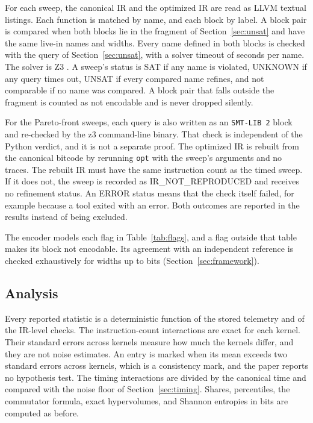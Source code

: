 For each sweep, the canonical IR and the optimized IR are read as LLVM textual listings. Each function is matched by name,
and each block by label. A block pair is compared when both blocks lie in the fragment of Section~\ref{sec:unsat} and have the
same live-in names and widths. Every name defined in both blocks is checked with the query of Section~\ref{sec:unsat}, with a
solver timeout of \ZThreeTimeoutSeconds{} seconds per name. The solver is Z3 \cite{demoura2008z3}. A sweep's status is SAT if any
name is violated, UNKNOWN if any query times out, UNSAT if every compared name refines, and not comparable if no name was
compared. A block pair that falls outside the fragment is counted as not encodable and is never dropped silently.

For the Pareto-front sweeps, each query is also written as an \texttt{SMT-LIB 2} block and re-checked by the z3 command-line
binary. That check is independent of the Python verdict, and it is not a separate proof. The optimized IR is rebuilt from the
canonical bitcode by rerunning \texttt{opt} with the sweep's arguments and no traces. The rebuilt IR must have the same
instruction count as the timed sweep. If it does not, the sweep is recorded as IR\_NOT\_REPRODUCED and receives no refinement
status. An ERROR status means that the check itself failed, for example because a tool exited with an error. Both outcomes are
reported in the results instead of being excluded.

The encoder models each flag in Table~\ref{tab:flags}, and a flag outside that table makes its block not encodable. Its agreement
with an independent reference is checked exhaustively for widths up to \EncodingMaxWidth{} bits (Section~\ref{sec:framework}).

\subsection{Analysis}

Every reported statistic is a deterministic function of the stored telemetry and of the IR-level checks. The instruction-count
interactions are exact for each kernel. Their standard errors across kernels measure how much the kernels differ, and they are
not noise estimates. An entry is marked when its mean exceeds two standard errors across kernels, which is a consistency mark,
and the paper reports no hypothesis test. The timing interactions are divided by the canonical time and compared with the noise
floor of Section~\ref{sec:timing}. Shares, percentiles, the commutator formula, exact hypervolumes, and Shannon entropies in bits
are computed as before.


